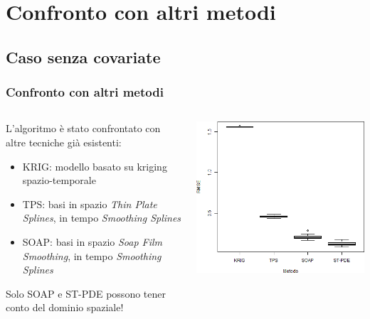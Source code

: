 \documentclass[landscape,9pt]{beamer}                           %
\begin{document}
\section{Confronto con altri metodi}
\subsection{Caso senza covariate}
\begin{frame}
\frametitle{Confronto con altri metodi}
\begin{columns}
	\begin{column}{0.6\textwidth}
	L'algoritmo è stato confrontato con altre tecniche già esistenti:
	\begin{itemize}
	\item KRIG: modello basato su kriging spazio-temporale
	\item TPS: basi in spazio \textit{Thin Plate Splines}, in tempo \textit{Smoothing Splines}
	\item SOAP: basi in spazio \textit{Soap Film Smoothing}, in tempo \textit{Smoothing Splines} 
	\end{itemize}
	Solo SOAP e ST-PDE possono tener conto del dominio spaziale!
	\end{column}
	\begin{column}{0.4\textwidth}
	\begin{flushright}
		\includegraphics[width=1\textwidth]{Immagini/Confronto_metodi.png}
	\end{flushright}		
	\end{column}
\end{columns}
\end{frame}
\end{document}
